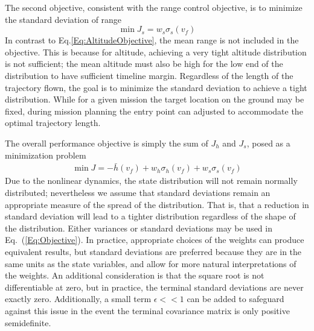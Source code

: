 The second objective, consistent with the range control objective, is to minimize the standard deviation of range 
\begin{equation}
	\min J_s = w_s\sigma_s(v_f) \label{Eq:RangeObjective}
\end{equation}
In contrast to Eq.\eqref{Eq:AltitudeObjective}, the mean range is not included in the objective. This is because for altitude, achieving a very tight altitude distribution is not sufficient; the mean altitude must also be high for the low end of the distribution to have sufficient timeline margin. Regardless of the length of the trajectory flown, the goal is to minimize the standard deviation to achieve a tight distribution. While for a given mission the target location on the ground may be fixed, during mission planning the entry point can adjusted to accommodate the optimal trajectory length. 

The overall performance objective is simply the sum of $J_h$ and $J_s$, posed as a minimization problem
\begin{align}
	\min J = -\bar{h}(v_f) + w_h\sigma_h(v_f) + w_s\sigma_s(v_f) \label{Eq:Objective}
\end{align}
Due to the nonlinear dynamics, the state distribution will not remain normally distributed; nevertheless we assume that standard deviations remain an appropriate measure of the spread of the distribution. That is, that a reduction in standard deviation will lead to a tighter distribution regardless of the shape of the distribution. Either variances or standard deviations may be used in Eq.~(\ref{Eq:Objective}). In practice, appropriate choices of the weights can produce equivalent results, but standard deviations are preferred because they are in the same units as the state variables, and allow for more natural interpretations of the weights. An additional consideration is that the square root is not differentiable at zero, but in practice, the terminal standard deviations are never exactly zero. Additionally, a small term $\epsilon<<1$ can be added to safeguard against this issue in the event the terminal covariance matrix is only positive semidefinite.


